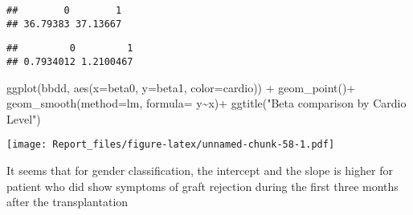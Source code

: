 \documentclass[
]{article}
\newenvironment{Shaded}{\begin{snugshade}}{\end{snugshade}}
\newcommand{\AttributeTok}[1]{\textcolor[rgb]{0.77,0.63,0.00}{#1}}
\newcommand{\FunctionTok}[1]{\textcolor[rgb]{0.00,0.00,0.00}{#1}}
\newcommand{\NormalTok}[1]{#1}
\newcommand{\OtherTok}[1]{\textcolor[rgb]{0.56,0.35,0.01}{#1}}
\newcommand{\SpecialCharTok}[1]{\textcolor[rgb]{0.00,0.00,0.00}{#1}}
\newcommand{\StringTok}[1]{\textcolor[rgb]{0.31,0.60,0.02}{#1}}
\begin{document}
\begin{Shaded}
\end{Shaded}

\begin{verbatim}
##        0        1 
## 36.79383 37.13667
\end{verbatim}

\begin{Shaded}
\end{Shaded}

\begin{verbatim}
##         0         1 
## 0.7934012 1.2100467
\end{verbatim}

\begin{Shaded}
\begin{Highlighting}[]
\FunctionTok{ggplot}\NormalTok{(bbdd, }\FunctionTok{aes}\NormalTok{(}\AttributeTok{x=}\NormalTok{beta0, }\AttributeTok{y=}\NormalTok{beta1, }\AttributeTok{color=}\NormalTok{cardio)) }\SpecialCharTok{+} \FunctionTok{geom\_point}\NormalTok{()}\SpecialCharTok{+}
  \FunctionTok{geom\_smooth}\NormalTok{(}\AttributeTok{method=}\StringTok{\textquotesingle{}lm\textquotesingle{}}\NormalTok{, }\AttributeTok{formula=}\NormalTok{ y}\SpecialCharTok{\textasciitilde{}}\NormalTok{x)}\SpecialCharTok{+}
\FunctionTok{ggtitle}\NormalTok{(}\StringTok{"Beta comparison by Cardio Level"}\NormalTok{)}
\end{Highlighting}
\end{Shaded}

\texttt{[image: Report\_files/figure-latex/unnamed-chunk-58-1.pdf]}

It seems that for gender classification, the intercept and the slope is
higher for patient who did show symptoms of graft rejection during the
first three months after the transplantation
\end{document}
